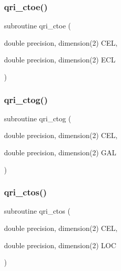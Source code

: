 \subsubsection{\texorpdfstring{qri\+\_\+ctoe()}{qri\_ctoe()}}
{\footnotesize\ttfamily subroutine qri\+\_\+ctoe (\begin{DoxyParamCaption}\item[{double precision, dimension(2)}]{C\+EL,  }\item[{double precision, dimension(2)}]{E\+CL }\end{DoxyParamCaption})}

\mbox{\label{qri__init_8f_abfa2508656ae8d72e8b83dba7ebd1983}} 
\subsubsection{\texorpdfstring{qri\+\_\+ctog()}{qri\_ctog()}}
{\footnotesize\ttfamily subroutine qri\+\_\+ctog (\begin{DoxyParamCaption}\item[{double precision, dimension(2)}]{C\+EL,  }\item[{double precision, dimension(2)}]{G\+AL }\end{DoxyParamCaption})}

\mbox{\label{qri__init_8f_a69d1cfcdc3af438747cc3eba6e84f177}} 
\subsubsection{\texorpdfstring{qri\+\_\+ctos()}{qri\_ctos()}}
{\footnotesize\ttfamily subroutine qri\+\_\+ctos (\begin{DoxyParamCaption}\item[{double precision, dimension(2)}]{C\+EL,  }\item[{double precision, dimension(2)}]{L\+OC }\end{DoxyParamCaption})}

\mbox{\label{qri__init_8f_a354a3d1e1dafab02a592ab49244ee4d8}} 
